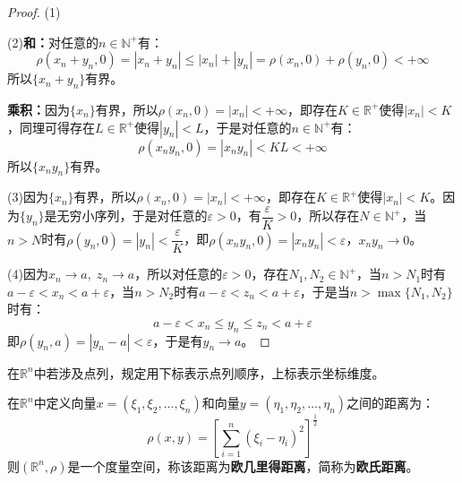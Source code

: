 \begin{proof}
	(1)\par
	(2)\textbf{和：}对任意的$n\in\mathbb{N}^+$有：
	\begin{equation*}
		\rho(x_n+y_n,0)=|x_n+y_n|\leqslant|x_n|+|y_n|=\rho(x_n,0)+\rho(y_n,0)<+\infty
	\end{equation*}
	所以$\{x_n+y_n\}$有界。\par
	\textbf{乘积：}因为$\{x_n\}$有界，所以$\rho(x_n,0)=|x_n|<+\infty$，即存在$K\in\mathbb{R}^{+}$使得$|x_n|<K$，同理可得存在$L\in\mathbb{R}^{+}$使得$|y_n|<L$，于是对任意的$n\in\mathbb{N}^+$有：
	\begin{equation*}
		\rho(x_ny_n,0)=|x_ny_n|<KL<+\infty
	\end{equation*}
	所以$\{x_ny_n\}$有界。\par
	(3)因为$\{x_n\}$有界，所以$\rho(x_n,0)=|x_n|<+\infty$，即存在$K\in\mathbb{R}^{+}$使得$|x_n|<K$。因为$\{y_n\}$是无穷小序列，于是对任意的$\varepsilon>0$，有$\dfrac{\varepsilon}{K}>0$，所以存在$N\in\mathbb{N}^+$，当$n>N$时有$\rho(y_n,0)=|y_n|<\dfrac{\varepsilon}{K}$，即$\rho(x_ny_n,0)=|x_ny_n|<\varepsilon$，$x_ny_n\to0$。\par
	(4)因为$x_n\to a,\;z_n\to a$，所以对任意的$\varepsilon>0$，存在$N_1,N_2\in\mathbb{N}^+$，当$n>N_1$时有$a-\varepsilon<x_n<a+\varepsilon$，当$n>N_2$时有$a-\varepsilon<z_n<a+\varepsilon$，于是当$n>\max\{N_1,N_2\}$时有：
	\begin{equation*}
		a-\varepsilon<x_n\leqslant y_n\leqslant z_n<a+\varepsilon
	\end{equation*}
	即$\rho(y_n,a)=|y_n-a|<\varepsilon$，于是有$y_n\to a$。
\end{proof}
在$\mathbb{R}^{n}$中若涉及点列，规定用下标表示点列顺序，上标表示坐标维度。
\begin{definition}
	在$\mathbb{R}^n$中定义向量$x=(\xi_1,\xi_2,\dots,\xi_n)$和向量$y=(\eta_1,\eta_2,\dots,\eta_n)$之间的距离为：
	\begin{equation*}
		\rho(x,y)=\left[\sum_{i=1}^n(\xi_i-\eta_i)^2\right]^{\frac{1}{2}}
	\end{equation*}
	则$(\mathbb{R}^n,\rho)$是一个度量空间，称该距离为\textbf{欧几里得距离}，简称为\textbf{欧氏距离}。
\end{definition}
